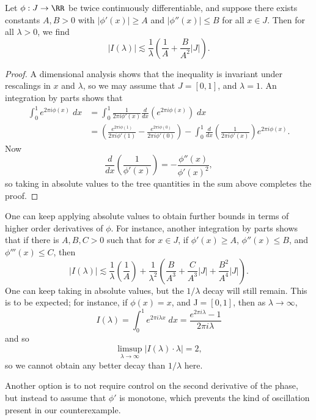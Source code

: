 \begin{theorem}
  Let $\phi: J \to \RR$ be twice continuously differentiable, and suppose there exists constants $A,B > 0$ with $|\phi'(x)| \geq A$ and $|\phi''(x)| \leq B$ for all $x \in J$. Then for all $\lambda > 0$, we find
  \[ |I(\lambda)| \lesssim \frac{1}{\lambda} \left( \frac{1}{A} + \frac{B}{A^2} |J| \right). \]
\end{theorem}
\begin{proof}
  A dimensional analysis shows that the inequality is invariant under rescalings in $x$ and $\lambda$, so we may assume that $J = [0,1]$, and $\lambda = 1$. An integration by parts shows that
  \begin{align*}
    \int_0^1 e^{2 \pi i \phi(x)}\; dx &= \int_0^1 \frac{1}{2 \pi i \phi'(x)} \frac{d}{dx} \left( e^{2 \pi i \phi(x)} \right)\; dx\\
    &= \left( \frac{e^{2 \pi i \phi(1)}}{2 \pi i \phi'(1)} - \frac{e^{2 \pi i \phi(0)}}{2 \pi i \phi'(0)} \right) - \int_0^1 \frac{d}{dx} \left( \frac{1}{2 \pi i \phi'(x)} \right) e^{2 \pi i \phi(x)}.
  \end{align*}
  Now
  \[ \frac{d}{dx} \left( \frac{1}{\phi'(x)} \right) = - \frac{\phi''(x)}{\phi'(x)^2}, \]
  so taking in absolute values to the tree quantities in the sum above completes the proof.
\end{proof}

One can keep applying absolute values to obtain further bounds in terms of higher order derivatives of $\phi$. For instance, another integration by parts shows that if there is $A,B,C > 0$ such that for $x \in J$, if $\phi'(x) \geq A$, $\phi''(x) \leq B$, and $\phi'''(x) \leq C$, then
%
\[ |I(\lambda)| \lesssim \frac{1}{\lambda} \left( \frac{1}{A} \right) + \frac{1}{\lambda^2} \left( \frac{B}{A^3} + \frac{C}{A^3} |J| + \frac{B^2}{A^4} |J| \right). \]
%
One can keep taking in absolute values, but the $1/\lambda$ decay will still remain. This is to be expected; for instance, if $\phi(x) = x$, and J$ = [0,1]$, then as $\lambda \to \infty$,
%
\[ I(\lambda) = \int_0^1 e^{2 \pi i \lambda x}\; dx = \frac{e^{2 \pi i \lambda} - 1}{2 \pi i \lambda} \]
%
and so
%
\[ \limsup_{\lambda \to \infty} |I(\lambda) \cdot \lambda| = 2, \]
%
so we cannot obtain any better decay than $1/\lambda$ here.

Another option is to not require control on the second derivative of the phase, but instead to assume that $\phi'$ is monotone, which prevents the kind of oscillation present in our counterexample.

